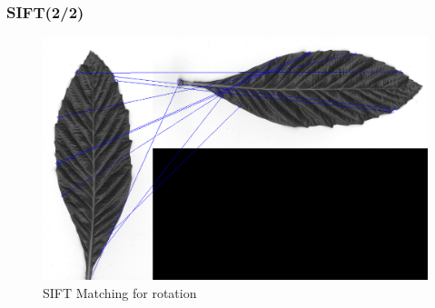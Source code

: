 \documentclass[xcolor=table]{beamer}
\begin{document}
\begin{frame} \frametitle{SIFT(2/2)}

\begin{figure}[htbp]
    \begin{minipage}[c]{.45\linewidth}
      \begin{center}
	\includegraphics[scale=0.20]{Capture1.png}
	\caption{SIFT Matching for rotation}
	\label{figure:Illustration}
      \end{center}
    \end{minipage}
    \hfill
    \begin{minipage}[c]{.45\linewidth}
      \begin{center}

\end{center}
\end{minipage}
\end{figure}
\end{frame}
\end{document}
